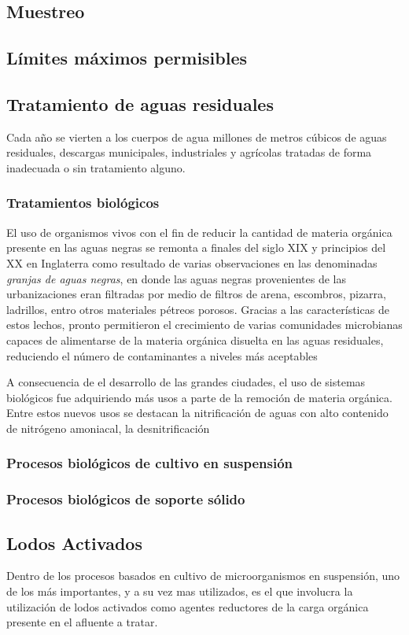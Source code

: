 \subsection{Muestreo}
\subsection{Límites máximos permisibles}\label{NOM2021}
\subsection{Tratamiento de aguas residuales}
Cada año se vierten a los cuerpos de agua millones de metros cúbicos de aguas residuales, descargas municipales, industriales y agrícolas tratadas de forma inadecuada o sin tratamiento alguno.
\subsubsection{Tratamientos biológicos}
El uso de organismos vivos con el fin de reducir la cantidad de materia orgánica presente en las aguas negras se remonta a finales del siglo XIX y principios del XX en Inglaterra como resultado de varias observaciones en las denominadas \emph{granjas de aguas negras}, en donde las aguas negras provenientes de las urbanizaciones eran filtradas por medio de filtros de arena, escombros, pizarra, ladrillos, entro otros materiales pétreos porosos. Gracias a las características de estos lechos, pronto permitieron el crecimiento de varias comunidades microbianas capaces de alimentarse de la materia orgánica disuelta en las aguas residuales, reduciendo el número de contaminantes a niveles más aceptables~\citep{Fair2008}\par
A consecuencia de el desarrollo de las grandes ciudades, el uso de sistemas biológicos fue adquiriendo más usos a parte de la remoción de materia orgánica. Entre estos nuevos usos se destacan la nitrificación de aguas con alto contenido de nitrógeno amoniacal, la desnitrificación 
\subsubsection{Procesos biológicos de cultivo en suspensión}
\subsubsection{Procesos biológicos de soporte sólido}
\subsection{Lodos Activados}
Dentro de los procesos basados en cultivo de microorganismos en suspensión, uno de los más importantes, y a su vez mas utilizados, es el que involucra la utilización de lodos activados como agentes reductores de la carga orgánica presente en el afluente a tratar.
